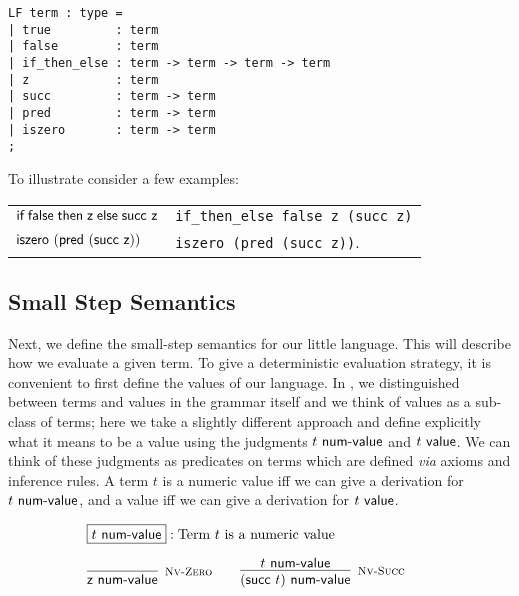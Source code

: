 \begin{lstlisting}
LF term : type =
| true         : term
| false        : term
| if_then_else : term -> term -> term -> term
| z            : term
| succ         : term -> term
| pred         : term -> term
| iszero       : term -> term
;
\end{lstlisting}

To illustrate consider a few examples:

\begin{center}
\begin{tabular}{l@{\quad is represented as \quad}l}
$\textsf{if\;} \textsf{false} \textsf{\;then\;} \textsf{z} \textsf{\;else\;} \textsf{succ}~\textsf{z}$ &
\lstinline!if_then_else false z (succ z)!\\
$\textsf{iszero}~(\textsf{pred}~(\textsf{succ}~\textsf{z}))$ & \lstinline!iszero (pred (succ z))!.
\end{tabular}  
\end{center}


\subsection{Small Step Semantics}

Next,  we define  the small-step semantics  for our  little language.  This will
describe  how  we evaluate  a  given term.  To give  a  deterministic evaluation
strategy,  it is convenient to first define the values of our language.  In
\cite{TAPL}, we distinguished between terms and values in the grammar itself and
we think of values  as a sub-class of terms;  here we take  a slightly different
approach and define explicitly  what it means  to be a value using the judgments
$t ~\textsf{num-value}$ and $t ~\mathsf{value}$.  We can think of these judgments  as predicates on
terms which are defined  {\em via}  axioms and inference rules.  A term $t$ is a
numeric value iff we can give a derivation for $t ~\textsf{num-value}$, and a value iff we
can give a derivation for $t ~\mathsf{value}$.

\[
\begin{array}{c}
\multicolumn{1}{l}{\fbox{$t \NumValue$}: \mbox{Term $t$ is a numeric value}}\\[1em]
\infer[\NVZero]{\tmzero \NumValue}{} \qquad
\infer[\NVSucc]{(\tmsucc t) \NumValue}{t \NumValue} \qquad
\end{array}
\]

